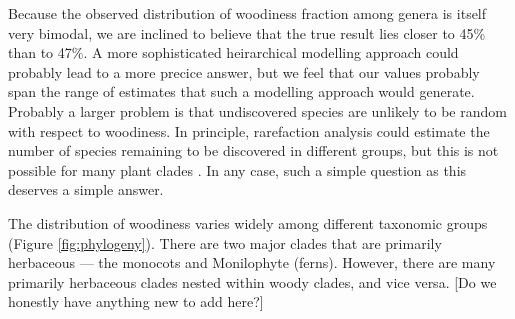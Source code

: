 \documentclass[12pt]{article}
\begin{document}
Because the observed distribution of woodiness fraction among genera
is itself very bimodal, we are inclined to believe that the true
result lies closer to 45\% than to 47\%.  A more sophisticated
heirarchical modelling approach could probably lead to a more precice
answer, but we feel that our values probably span the range of
estimates that such a modelling approach would generate.  
%
Probably a larger problem is that undiscovered species are unlikely to
be random with respect to woodiness.  In principle, rarefaction
analysis could estimate the number of species remaining to be
discovered in different groups, but this is not possible for many
plant clades \citep{costello2011}.
%
In any case, such a simple question as this deserves a simple answer.


The distribution of woodiness varies widely among different taxonomic
groups (Figure \ref{fig:phylogeny}).  There are two major clades that
are primarily herbaceous --- the monocots and Monilophyte (ferns).
However, there are many primarily herbaceous clades nested within
woody clades, and vice versa.  [Do we honestly have anything new to
add here?]
\end{document}
